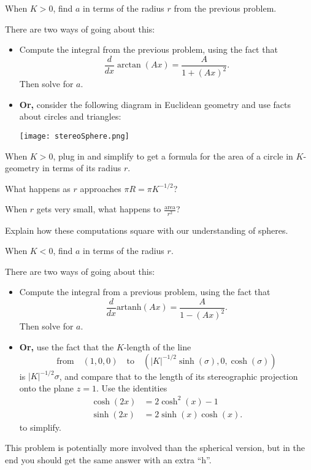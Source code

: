 \documentclass[newpage,hints,12pt,noauthor,nooutcomes]{ximera}
\begin{document}
\begin{problem}
  When $K>0$, find $a$ in terms of the radius $r$ from the previous problem.
  \begin{hint}
    There are two ways of going about this:
    \begin{itemize}
    \item Compute the integral from the previous problem, using the fact that
      \[\frac{d}{dx}\arctan(Ax)=\frac{A}{1+(Ax)^2}.\]
      Then solve for $a$.
    \item \textbf{Or,} consider the following diagram in Euclidean geometry and
      use facts about circles and triangles:
      \begin{image}
        \texttt{[image: stereoSphere.png]}
      \end{image}
    \end{itemize}
  \end{hint}
\end{problem}

\begin{problem}
  When $K>0$, plug in and simplify to get a formula for the area of a circle in
  $K$-geometry in terms of its radius $r$.
\end{problem}

\begin{problem}
  What happens as $r$ approaches $\pi R=\pi K^{-1/2}$?

  When $r$ gets very small, what happens to $\frac{\text{area}}{r^2}$?

  Explain how these computations square with our understanding of spheres.
\end{problem}

\begin{problem}
  When $K<0$, find $a$ in terms of the radius $r$.
  \begin{hint}
    There are two ways of going about this:
    \begin{itemize}
    \item Compute the integral from a previous problem,  using the fact that
      \[\frac{d}{dx}\mathrm{artanh}(Ax)=\frac{A}{1-(Ax)^2}.\]
      Then solve for $a$.
    \item \textbf{Or,} use the fact that the $K$-length of the line
      $$\text{from}\quad(1,0,0)\quad\text{to}\quad
      (|K|^{-1/2}\sinh(\sigma),0,\cosh(\sigma))$$
      is $|K|^{-1/2}\sigma$, and compare that to the length of its stereographic
      projection onto the plane $z=1$.  Use the identities
      \begin{align*}
        \cosh(2x) &= 2\cosh^2(x)-1 \\
        \sinh(2x) &= 2\sinh(x)\cosh(x).
      \end{align*}
      to simplify.
    \end{itemize}
  \end{hint}
  \begin{hint}
    This problem is potentially more involved than the spherical version, but in
    the end you should get the same answer with an extra ``h''.
  \end{hint}
\end{problem}
\end{document}

